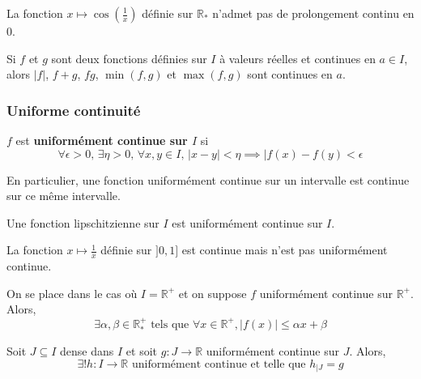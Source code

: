   \begin{example}
    La fonction $x \mapsto \cos \left( \frac{1}{x} \right)$ définie sur $\mathbb{R}_*$ n'admet pas de prolongement continu en $0$.
  \end{example}

  \begin{proposition}
    Si $f$ et $g$ sont deux fonctions définies sur $I$ à valeurs réelles et continues en $a \in I$, alors $\vert f \vert$, $f + g$, $fg$, $\min(f,g)$ et $\max(f,g)$ sont continues en $a$.
  \end{proposition}

  \subsubsection{Uniforme continuité}


  \begin{definition}
    $f$ est \textbf{uniformément continue sur $I$} si
    \[ \forall \epsilon > 0, \, \exists \eta > 0, \, \forall x, y \in I, \, \vert x - y \vert < \eta \implies \vert f(x) - f(y) < \epsilon \]
  \end{definition}

  \begin{remark}
    En particulier, une fonction uniformément continue sur un intervalle est continue sur ce même intervalle.
  \end{remark}

  \begin{example}
    Une fonction lipschitzienne sur $I$ est uniformément continue sur $I$.
  \end{example}

  \begin{cexample}
    La fonction $x \mapsto \frac{1}{x}$ définie sur $]0,1]$ est continue mais n'est pas uniformément continue.
  \end{cexample}


  \begin{proposition}
    On se place dans le cas où $I = \mathbb{R}^+$ et on suppose $f$ uniformément continue sur $\mathbb{R}^+$. Alors,
    \[ \exists \alpha, \beta \in \mathbb{R}^+_* \text{ tels que } \forall x \in \mathbb{R}^+, \vert f(x) \vert \leq \alpha x + \beta \]
  \end{proposition}


  \begin{theorem}
    Soit $J \subseteq I$ dense dans $I$ et soit $g : J \rightarrow \mathbb{R}$ uniformément continue sur $J$. Alors,
    \[ \exists! h : I \rightarrow \mathbb{R} \text{ uniformément continue et telle que } h_{|J} = g \]
  \end{theorem}

